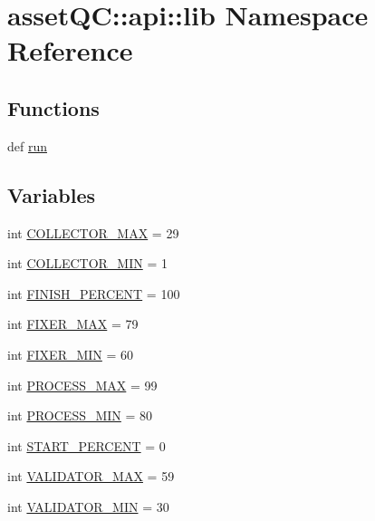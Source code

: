 \hypertarget{namespaceassetQC_1_1api_1_1lib}{\section{asset\-Q\-C\-:\-:api\-:\-:lib \-Namespace \-Reference}
\label{d0/d0c/namespaceassetQC_1_1api_1_1lib}
}
\subsection*{\-Functions}
\begin{DoxyCompactItemize}
\item 
def \hyperlink{namespaceassetQC_1_1api_1_1lib_aae391026440eb321f69eb221ff84d902}{run}
\end{DoxyCompactItemize}
\subsection*{\-Variables}
\begin{DoxyCompactItemize}
\item 
int \hyperlink{namespaceassetQC_1_1api_1_1lib_a357b88752480ac61b0bfc4277501ec64}{\-C\-O\-L\-L\-E\-C\-T\-O\-R\-\_\-\-M\-A\-X} = 29
\item 
int \hyperlink{namespaceassetQC_1_1api_1_1lib_a5476b0ae8899a971ed7094b029122060}{\-C\-O\-L\-L\-E\-C\-T\-O\-R\-\_\-\-M\-I\-N} = 1
\item 
int \hyperlink{namespaceassetQC_1_1api_1_1lib_aeae5864c292b953b80f3d491510b8aad}{\-F\-I\-N\-I\-S\-H\-\_\-\-P\-E\-R\-C\-E\-N\-T} = 100
\item 
int \hyperlink{namespaceassetQC_1_1api_1_1lib_a98e10bbfe008c239c013d9afdfd49459}{\-F\-I\-X\-E\-R\-\_\-\-M\-A\-X} = 79
\item 
int \hyperlink{namespaceassetQC_1_1api_1_1lib_ae10c8faa2d931fe7bf7dd484dba87a06}{\-F\-I\-X\-E\-R\-\_\-\-M\-I\-N} = 60
\item 
int \hyperlink{namespaceassetQC_1_1api_1_1lib_a9cd204b641d7f5436709c28aa8becb2e}{\-P\-R\-O\-C\-E\-S\-S\-\_\-\-M\-A\-X} = 99
\item 
int \hyperlink{namespaceassetQC_1_1api_1_1lib_a7ab8b7443a93f8688f1511d87baa2d47}{\-P\-R\-O\-C\-E\-S\-S\-\_\-\-M\-I\-N} = 80
\item 
int \hyperlink{namespaceassetQC_1_1api_1_1lib_a2ed90379a54b2a0690cdb8c5f0273a21}{\-S\-T\-A\-R\-T\-\_\-\-P\-E\-R\-C\-E\-N\-T} = 0
\item 
int \hyperlink{namespaceassetQC_1_1api_1_1lib_a3428fb1cbffaad5d05f6471df73ac145}{\-V\-A\-L\-I\-D\-A\-T\-O\-R\-\_\-\-M\-A\-X} = 59
\item 
int \hyperlink{namespaceassetQC_1_1api_1_1lib_ad014e0d97f40bdf20edd6c0340a02c26}{\-V\-A\-L\-I\-D\-A\-T\-O\-R\-\_\-\-M\-I\-N} = 30
\end{DoxyCompactItemize}


